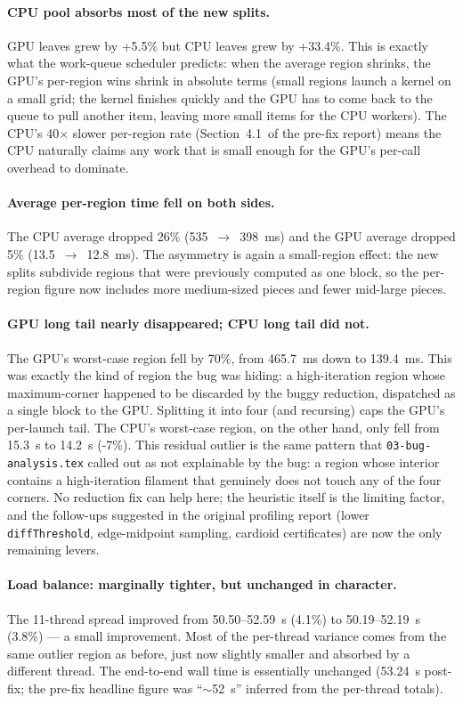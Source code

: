 \documentclass[
	english,
	letterpaper, oneside
]{article}
\begin{document}
\paragraph{CPU pool absorbs most of the new splits.} GPU leaves grew by
+5.5\% but CPU leaves grew by +33.4\%. This is exactly what the
work-queue scheduler predicts: when the average region shrinks, the GPU's
per-region wins shrink in absolute terms (small regions launch a kernel
on a small grid; the kernel finishes quickly and the GPU has to come
back to the queue to pull another item, leaving more small items for the
CPU workers). The CPU's 40$\times$ slower per-region rate
(Section~4.1~of the pre-fix report) means the CPU naturally claims any
work that is small enough for the GPU's per-call overhead to dominate.

\paragraph{Average per-region time fell on both sides.} The CPU average
dropped 26\% (535~$\to$~398~ms) and the GPU average dropped 5\%
(13.5~$\to$~12.8~ms). The asymmetry is again a small-region effect: the
new splits subdivide regions that were previously computed as one block,
so the per-region figure now includes more medium-sized pieces and
fewer mid-large pieces.

\paragraph{GPU long tail nearly disappeared; CPU long tail did not.}
The GPU's worst-case region fell by 70\%, from 465.7~ms down to
139.4~ms. This was exactly the kind of region the bug was hiding: a
high-iteration region whose maximum-corner happened to be discarded by
the buggy reduction, dispatched as a single block to the GPU. Splitting
it into four (and recursing) caps the GPU's per-launch tail. The CPU's
worst-case region, on the other hand, only fell from 15.3~s to 14.2~s
(-7\%). This residual outlier is the same pattern that
\texttt{03-bug-analysis.tex} called out as not explainable by the
bug: a region whose interior contains a high-iteration filament that
genuinely does not touch any of the four corners. No reduction fix can
help here; the heuristic itself is the limiting factor, and the
follow-ups suggested in the original profiling report (lower
\texttt{diffThreshold}, edge-midpoint sampling, cardioid certificates)
are now the only remaining levers.

\paragraph{Load balance: marginally tighter, but unchanged in character.}
The 11-thread spread improved from 50.50--52.59~s (4.1\%) to
50.19--52.19~s (3.8\%) --- a small improvement. Most of the per-thread
variance comes from the same outlier region as before, just now slightly
smaller and absorbed by a different thread. The end-to-end wall time is
essentially unchanged (53.24~s post-fix; the pre-fix headline figure was
``$\sim$52~s'' inferred from the per-thread totals).
\end{document}
